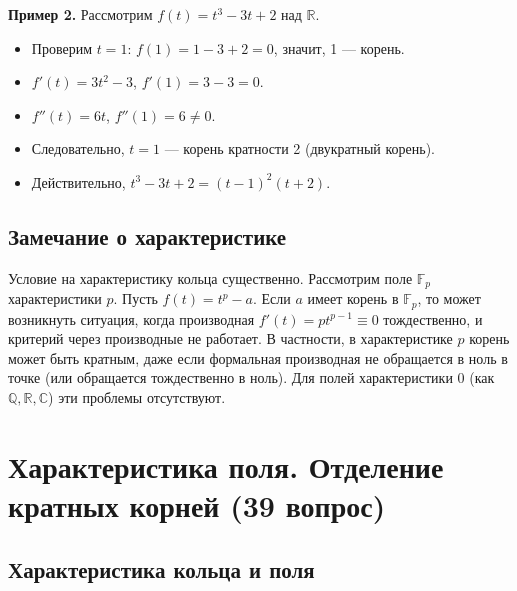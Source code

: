 \documentclass[a4paper,12pt]{article}
\theoremstyle{definition}
\theoremstyle{plain}
\theoremstyle{remark}
\begin{document}
	\textbf{Пример 2.} Рассмотрим \( f(t) = t^3 - 3t + 2 \) над \( \mathbb{R} \).
	\begin{itemize}
		\item Проверим \( t = 1 \): \( f(1) = 1 - 3 + 2 = 0 \), значит, 1 — корень.
		\item \( f'(t) = 3t^2 - 3 \), \( f'(1) = 3 - 3 = 0 \).
		\item \( f''(t) = 6t \), \( f''(1) = 6 \neq 0 \).
		\item Следовательно, \( t = 1 \) — корень кратности 2 (двукратный корень).
		\item Действительно, \( t^3 - 3t + 2 = (t-1)^2(t+2) \).
	\end{itemize}
	
	\subsection{Замечание о характеристике}
	
	Условие на характеристику кольца существенно. Рассмотрим поле \( \mathbb{F}_p \) характеристики \( p \). Пусть \( f(t) = t^p - a \). Если \( a \) имеет корень в \( \mathbb{F}_p \), то может возникнуть ситуация, когда производная \( f'(t) = p t^{p-1} \equiv 0 \) тождественно, и критерий через производные не работает. В частности, в характеристике \( p \) корень может быть кратным, даже если формальная производная не обращается в ноль в точке (или обращается тождественно в ноль). Для полей характеристики 0 (как \( \mathbb{Q}, \mathbb{R}, \mathbb{C} \)) эти проблемы отсутствуют.
	
	
	
	
	
	
	\newpage
	\section{Характеристика поля. Отделение кратных корней (39 вопрос)}
	
	\subsection{Характеристика кольца и поля}
	
\end{document}
